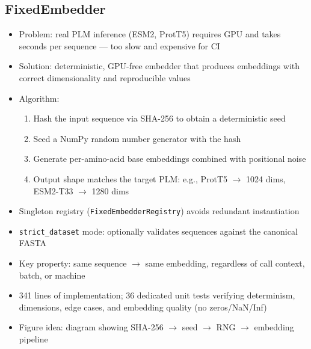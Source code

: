 \subsection{FixedEmbedder}\label{sec:fixed-embedder}
\begin{itemize}
  \item Problem: real PLM inference (ESM2, ProtT5) requires GPU and takes seconds per sequence --- too slow and expensive for CI
  \item Solution: deterministic, GPU-free embedder that produces embeddings with correct dimensionality and reproducible values
  \item Algorithm:
    \begin{enumerate}
      \item Hash the input sequence via SHA-256 to obtain a deterministic seed
      \item Seed a NumPy random number generator with the hash
      \item Generate per-amino-acid base embeddings combined with positional noise
      \item Output shape matches the target PLM: e.g., ProtT5 $\to$ 1024 dims, ESM2-T33 $\to$ 1280 dims
    \end{enumerate}
  \item Singleton registry (\texttt{FixedEmbedderRegistry}) avoids redundant instantiation
  \item \texttt{strict\_dataset} mode: optionally validates sequences against the canonical FASTA
  \item Key property: same sequence $\to$ same embedding, regardless of call context, batch, or machine
  \item 341 lines of implementation; 36 dedicated unit tests verifying determinism, dimensions, edge cases, and embedding quality (no zeros/NaN/Inf)
  \item Figure idea: diagram showing SHA-256 $\to$ seed $\to$ RNG $\to$ embedding pipeline
\end{itemize}

